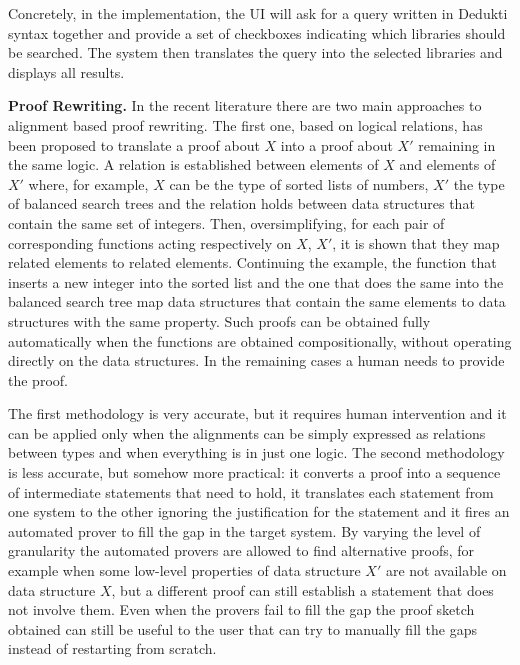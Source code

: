 Concretely, in the implementation, the UI will ask for a query written in Dedukti syntax together and provide a set of checkboxes indicating which libraries should be searched.
The system then translates the query into the selected libraries and displays all results.

\textbf{Proof Rewriting.} In the recent literature there are two main
approaches to alignment based proof rewriting. The first one, based on
logical relations, has been proposed to translate a proof about $X$
into a proof about $X'$ remaining in the same logic. A relation is
established between elements of $X$ and elements of $X'$ where, for
example, $X$ can be the type of sorted lists of numbers, $X'$ the type
of balanced search trees and the relation holds between data
structures that contain the same set of integers. Then,
oversimplifying, for each pair of corresponding functions acting
respectively on $X$, $X'$, it is shown that they map related elements
to related elements. Continuing the example, the function that inserts
a new integer into the sorted list and the one that does the same into
the balanced search tree map data structures that contain the same
elements to data structures with the same property. Such proofs can be
obtained fully automatically when the functions are obtained
compositionally, without operating directly on the data structures. In
the remaining cases a human needs to provide the proof.

The first methodology is very accurate, but it requires human
intervention and it can be applied only when the alignments can be
simply expressed as relations between types and when everything is in
just one logic. The second methodology is less accurate, but somehow
more practical: it converts a proof into a sequence of intermediate
statements that need to hold, it translates each statement from one
system to the other ignoring the justification for the statement and
it fires an automated prover to fill the gap in the target system. By
varying the level of granularity the automated provers are allowed to
find alternative proofs, for example when some low-level properties of
data structure $X'$ are not available on data structure $X$, but a
different proof can still establish a statement that does not involve
them. Even when the provers fail to fill the gap the proof sketch
obtained can still be useful to the user that can try to manually fill
the gaps instead of restarting from scratch.

